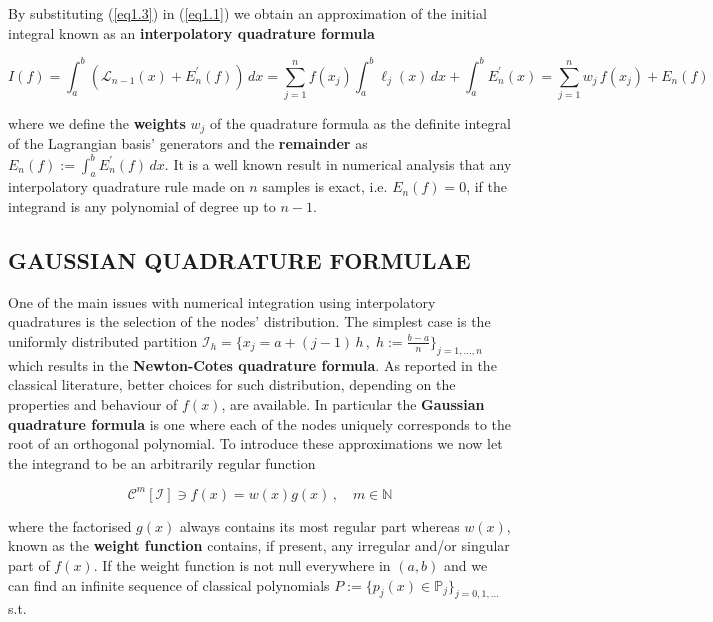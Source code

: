 \documentclass[a4paper, twosided]{book}
\begin{document}
\color{black}

\noindent
By substituting (\ref{eq1.3}) in (\ref{eq1.1}) we obtain an approximation of the initial integral known as an \color{poliDarkBlue} \textbf{interpolatory quadrature formula} \color{black}

\begin{equation}\label{eq1.4}
    I(f) = \int_a^b (\mathcal{L}_{n-1}(x) + E^{'}_n(f))\,dx = \sum_{j=1}^{n}f(x_j)\int_a^b \ell_j(x)\,dx + \int_a^b E^{'}_n(x) = \sum_{j=1}^{n}w_j\,f(x_j) + E_n(f)
\end{equation}

\noindent
where we define the \color{poliDarkBlue} \textbf{weights} \color{black} $w_j$ of the quadrature formula as the definite integral of the Lagrangian basis' generators and the \color{poliDarkBlue} \textbf{remainder} \color{black} as $E_n(f):=\int_a^b E^{'}_n(f)\,dx$. It is a well known result in numerical analysis that any interpolatory quadrature rule made on $n$ samples is exact, i.e. $E_n(f)=0$, if the integrand is any polynomial of degree up to $n-1$.

\subsection[Gaussian quadrature formulae]{\changefont GAUSSIAN QUADRATURE FORMULAE}\label{SubSec1.2.2}

One of the main issues with numerical integration using interpolatory quadratures is the selection of the nodes' distribution. The simplest case is the uniformly distributed partition 
$\mathcal{I}_h =\big\{x_j = a + (j-1)\,h\,,\;h:=\frac{b-a}{n}\big\}_{j=1,...,n}$ which results in the \color{poliDarkBlue} \textbf{Newton-Cotes quadrature formula}\color{black}. As reported in the classical literature, better choices for such distribution, depending on the properties and behaviour of $f(x)$, are available. In particular the \color{poliDarkBlue} \textbf{Gaussian quadrature formula} \color{black} is one where each of the nodes uniquely corresponds to the root of an orthogonal polynomial. To introduce these approximations we now let the integrand to be an arbitrarily regular function

\begin{equation}\label{eq1.5}
    \mathcal{C}^m[\mathcal{I}]\ni f(x) = w(x)g(x)\,,\quad m\in\mathbb{N}
\end{equation}

\noindent
where the factorised $g(x)$ always contains its most regular part whereas $w(x)$, known as the \color{poliDarkBlue} \textbf{weight function} \color{black} contains, if present, any irregular and/or singular part of $f(x)$. If the weight function is not null everywhere in $(a,b)$ and we can find an infinite sequence of classical polynomials $P:=\big\{p_j(x)\in\mathbb{P}_j\big\}_{j=0,1,...}$ s.t.
\end{document}
